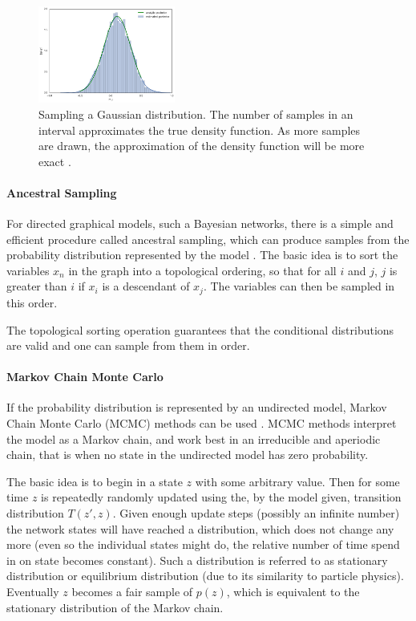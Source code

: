 \begin{figure}
	\centering
    	\includegraphics[width=0.4\textwidth]{imgs/sampling.png} 
    \caption{Sampling a Gaussian distribution. The number of samples in an interval approximates the true density function. As more samples are drawn, the approximation of the density function will be more exact \cite{sampleFD}.}
	\label{fig:Sampling}
\end{figure}



\paragraph{Ancestral Sampling} For directed graphical models, such a Bayesian networks, there is a simple and efficient procedure called ancestral sampling, which can produce samples from the probability distribution represented by the model \cite{Goodfellow-et-al-2016-Book}. 
The basic idea is to sort the variables $x_n$ in the graph into a topological ordering, so that for all $i$ and $j$, $j$ is greater than $i$ if $x_i$ is a descendant of $x_j$. The variables can then be sampled in this order.

The topological sorting operation guarantees that the conditional distributions are valid and one can sample from them in order.

\paragraph{Markov Chain Monte Carlo} If the probability distribution is represented by an undirected model, Markov Chain Monte Carlo (MCMC) methods can be used \cite{Goodfellow-et-al-2016-Book}. 
MCMC methods interpret the model as a Markov chain, and work best in an irreducible and aperiodic chain, that is when no state in the undirected model has zero probability.

The basic idea is to begin in a state $z$ with some arbitrary value. 
Then for some time $z$ is repeatedly randomly updated using the, by the model given, transition distribution $T(z',z)$. 
Given enough update steps (possibly an infinite number) the network states will have reached a distribution, which does not change any more (even so the individual states might do, the relative number of time spend in on state becomes constant).
Such a distribution is referred to as stationary distribution or equilibrium distribution (due to its similarity to particle physics).
Eventually $z$ becomes a fair sample of $p(z)$, which is equivalent to the stationary distribution of the Markov chain.

